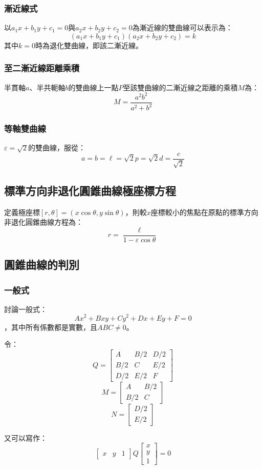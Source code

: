 \documentclass[a4paper,12pt]{article}
\begin{document}
\subsubsection{漸近線式}
以$a_1x+b_1y+c_1=0$與$a_2x+b_2y+c_2=0$為漸近線的雙曲線可以表示為：
\[(a_1x+b_1y+c_1)(a_2x+b_2y+c_2)=k\]
其中$k=0$時為退化雙曲線，即該二漸近線。
\subsubsection{至二漸近線距離乘積}
半貫軸$a$、半共軛軸$b$的雙曲線上一點$P$至該雙曲線的二漸近線之距離的乘積$M$為：
\[M=\frac{a^2b^2}{a^2+b^2}\]
\subsubsection{等軸雙曲線}
$\varepsilon=\sqrt{2}$的雙曲線，服從：
\[a=b=\ell=\sqrt{2}p=\sqrt{2}d=\frac{c}{\sqrt{2}}\]
\subsection{標準方向非退化圓錐曲線極座標方程}
定義極座標$[r,\theta]=(x\cos\theta,y\sin\theta)$，則較$x$座標較小的焦點在原點的標準方向非退化圓錐曲線方程為：
\[r=\frac{\ell}{1-\varepsilon\cos\theta}\]
\subsection{圓錐曲線的判別}
\subsubsection{一般式}
討論一般式：
\[Ax^2+Bxy+Cy^2+Dx+Ey+F=0\]
，其中所有係數都是實數，且$ABC\neq 0$。

令：
\[Q=\begin{bmatrix} A & B/2 & D/2 \\ B/2 & C & E/2 \\ D/2 & E/2 & F \end{bmatrix}\]
\[ M =
\begin{bmatrix} A & B/2 \\ B/2 & C \end{bmatrix}\]
\[N =
\begin{bmatrix} D/2 \\ E/2 \end{bmatrix}\]

又可以寫作：
\[\begin{bmatrix} x & y & 1 \end{bmatrix}
Q\begin{bmatrix} x \\ y \\ 1 \end{bmatrix} = 0\]
\end{document}
